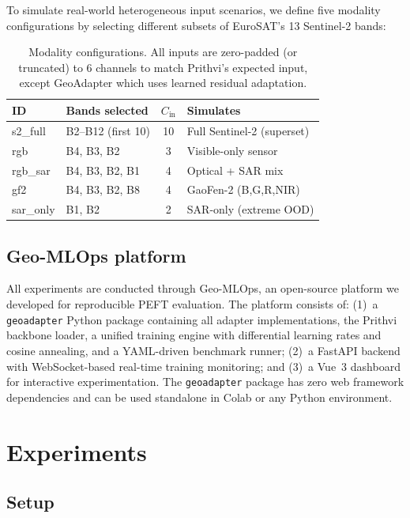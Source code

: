 \documentclass{article}
\begin{document}
To simulate real-world heterogeneous input scenarios, we define five modality configurations by selecting different subsets of EuroSAT's 13 Sentinel-2 bands:

\begin{table}[htbp]
\centering
\caption{Modality configurations. All inputs are zero-padded (or truncated) to 6 channels to match Prithvi's expected input, except GeoAdapter which uses learned residual adaptation.}
\label{tab:modalities}
\begin{tabular}{llcl}
\toprule
ID & Bands selected & $C_{\text{in}}$ & Simulates \\
\midrule
s2\_full & B2--B12 (first 10) & 10 & Full Sentinel-2 (superset) \\
rgb & B4, B3, B2 & 3 & Visible-only sensor \\
rgb\_sar & B4, B3, B2, B1 & 4 & Optical + SAR mix \\
gf2 & B4, B3, B2, B8 & 4 & GaoFen-2 (B,G,R,NIR) \\
sar\_only & B1, B2 & 2 & SAR-only (extreme OOD) \\
\bottomrule
\end{tabular}
\end{table}

\subsection{Geo-MLOps platform}

All experiments are conducted through Geo-MLOps, an open-source platform we developed for reproducible PEFT evaluation. The platform consists of: (1)~a \texttt{geoadapter} Python package containing all adapter implementations, the Prithvi backbone loader, a unified training engine with differential learning rates and cosine annealing, and a YAML-driven benchmark runner; (2)~a FastAPI backend with WebSocket-based real-time training monitoring; and (3)~a Vue~3 dashboard for interactive experimentation. The \texttt{geoadapter} package has zero web framework dependencies and can be used standalone in Colab or any Python environment.

\section{Experiments}
\label{sec:experiments}

\subsection{Setup}
\end{document}
